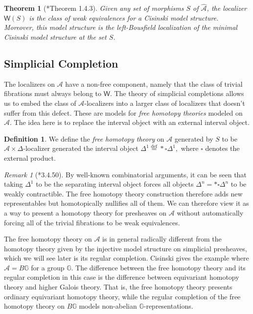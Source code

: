 \documentclass[a4paper]{article}
\numberwithin{equation}{subsection}
\theoremstyle{plain}   %
\newtheorem{thm}[equation]{Theorem}
\theoremstyle{definition}
\newtheorem{defn}[equation]{Definition}
\theoremstyle{remark}
\newtheorem{rem}[equation]{Remark}
\theoremstyle{plain}
\newcommand{\psh}[1]{\ensuremath{\widehat{#1}}}
\newcommand{\defeq}{\overset{\mathrm{def}}=}
\begin{document}
\begin{thm}[\cite{cisinski-book}*{Theorem 1.4.3}]
	Given any set of morphisms \(S\) of \(\psh{\mathcal{A}}\), the localizer \(\mathsf{W}(S)\) is the class of weak equivalences for a Cisinski model structure.  Moreover, this model structure is the left-Bousfield localization of the minimal Cisinski model structure at the set \(S\).
\end{thm}
\subsection{Simplicial Completion}
The localizers on \(\mathcal{A}\) have a non-free component, namely that the class of trivial fibrations must always belong to \(\mathsf{W}\).  The theory of simplicial completions allows us to embed the class of \(\mathcal{A}\)-localizers into a larger class of localizers that doesn't suffer from this defect.  These are models for \emph{free homotopy theories} modeled on \(\mathcal{A}\).  The idea here is to replace the interval object with an external interval object.
\begin{defn}
	We define the \emph{free homotopy theory} on \(\mathcal{A}\) generated by \(S\) to be \(\mathcal{A}\times \Delta\)-localizer generated the interval object \(\Delta^1 \defeq \ast \square \Delta^1,\) where \(\square\) denotes the external product.  
\end{defn}
\begin{rem}[\cite{cisinski-book}*{3.4.50}]
	By well-known combinatorial arguments, it can be seen that taking \(\Delta^1\) to be the separating interval object forces all objects \(\Delta^n=\ast \square \Delta^n\) to be weakly contractible. The free homotopy theory construction therefore adds new representables but homotopically nullifies all of them.  We can therefore view it as a way to present a homotopy theory for presheaves on \(\mathcal{A}\) without automatically forcing all of the trivial fibrations to be weak equivalences. 

	The free homotopy theory on \(\mathcal{A}\) is in general radically different from the homotopy theory given by the injective model structure on simplicial presheaves, which we will see later is its regular completion.  Cisinski gives the example where \(\mathcal{A}=B\mathbb{G}\) for a group \(\mathbb{G}\).  The difference between the free homotopy theory and its regular completion in this case is the difference between equivariant homotopy theory and higher Galois theory.  That is, the free homotopy theory presents ordinary equivariant homotopy theory, while the regular completion of the free homotopy theory on \(B\mathbb{G}\) models non-abelian \(\mathbb{G}\)-representations. 
\end{rem}
\end{document}
